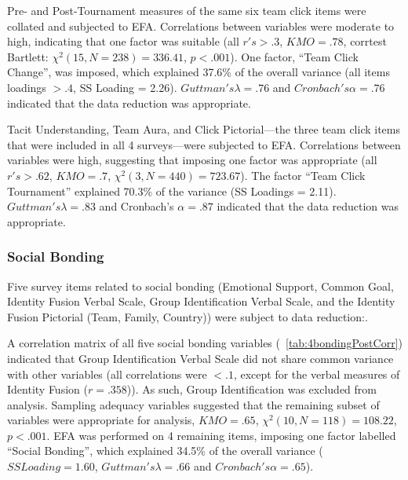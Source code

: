 \begin{CJK}{UTF8}{gbsn}
Pre- and Post-Tournament measures of the same six team click items were collated and subjected to EFA. Correlations between variables were moderate to high, indicating that one factor was suitable (all $r's > .3$, $KMO = .78$, corrtest Bartlett: $\chi^2(15, N = 238) = 336.41$, $p < .001$).  One factor, ``Team Click Change'', was imposed, which explained 37.6\% of the overall variance (all items loadings $> .4$, SS Loading = 2.26).  $Guttman's \lambda =.76$ and $Cronbach's \alpha = .76$ indicated that the data reduction was appropriate.

Tacit Understanding, Team Aura, and Click Pictorial---the three team click items that were included in all 4 surveys---were subjected to EFA.  Correlations between variables were high, suggesting that imposing one factor was appropriate (all $r's > .62$, $KMO = .7$, $\chi^2(3, N = 440) = 723.67$).  The factor ``Team Click Tournament'' explained 70.3\% of the variance (SS Loadings = 2.11).  $Guttman's \lambda =.83$ and Cronbach's $\alpha = .87$ indicated that the data reduction was appropriate.




\subsubsection{Social Bonding}
Five survey items related to social bonding (Emotional Support, Common Goal, Identity Fusion Verbal Scale, Group Identification Verbal Scale, and the Identity Fusion Pictorial (Team, Family, Country)) were subject to data reduction:.

A correlation matrix of all five social bonding variables (~\ref{tab:4bondingPostCorr}) indicated that Group Identification Verbal Scale did not share common variance with other variables (all correlations were $<.1$, except for the verbal measures of Identity Fusion ($r =.358$)). As such, Group Identification was excluded from analysis.  Sampling adequacy variables suggested that the remaining subset of variables were appropriate for analysis, $KMO = .65$, $\chi^2(10, N = 118) = 108.22$, $p < .001$.  EFA was performed on 4 remaining items, imposing one factor labelled ``Social Bonding'', which explained 34.5\% of the overall variance ($SS Loading = 1.60$, $Guttman's \lambda =.66$ and $Cronbach's \alpha = .65$).


\end{CJK}
